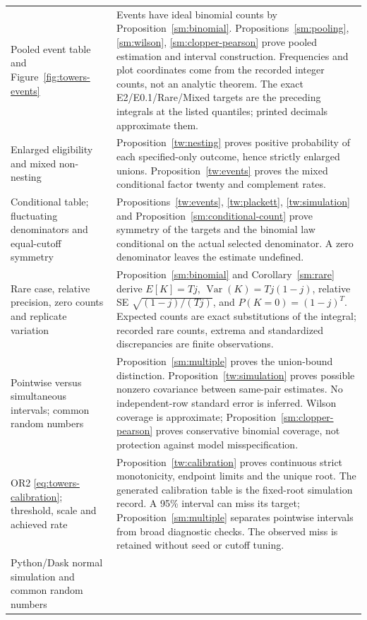 \begin{longtable}{>{\raggedright\arraybackslash}p{.29\linewidth}>{\raggedright\arraybackslash}p{.64\linewidth}}
Pooled event table and Figure~\ref{fig:towers-events}
& Events have ideal binomial counts by Proposition~\ref{sm:binomial}.
Propositions~\ref{sm:pooling}, \ref{sm:wilson}, \ref{sm:clopper-pearson}
prove pooled estimation and interval construction. Frequencies and plot
coordinates come from the recorded integer counts, not an analytic theorem.
The exact E2/E0.1/Rare/Mixed targets are the preceding integrals at the
listed quantiles; printed decimals approximate them.\\
Enlarged eligibility and mixed non-nesting
& Proposition~\ref{tw:nesting} proves positive probability of each
specified-only outcome, hence strictly enlarged unions. Proposition~\ref{tw:events}
proves the mixed conditional factor twenty and complement rates.\\
Conditional table; fluctuating denominators and equal-cutoff symmetry
& Propositions~\ref{tw:events}, \ref{tw:plackett}, \ref{tw:simulation}
and Proposition~\ref{sm:conditional-count} prove symmetry of the targets and
the binomial law conditional on the actual selected denominator. A zero
denominator leaves the estimate undefined.\\
Rare case, relative precision, zero counts and replicate variation
& Proposition~\ref{sm:binomial} and Corollary~\ref{sm:rare} derive \(E[K]=Tj\),
\(\operatorname{Var}(K)=Tj(1-j)\), relative SE
\(\sqrt{(1-j)/(Tj)}\), and \(P(K=0)=(1-j)^T\).
Expected counts are exact substitutions of the integral; recorded rare
counts, extrema and standardized discrepancies are finite observations.\\
Pointwise versus simultaneous intervals; common random numbers
& Proposition~\ref{sm:multiple} proves the union-bound distinction.
Proposition~\ref{tw:simulation} proves possible nonzero covariance between
same-pair estimates. No independent-row standard error is inferred. Wilson
coverage is approximate; Proposition~\ref{sm:clopper-pearson} proves conservative
binomial coverage, not protection against model misspecification.\\
OR2 \eqref{eq:towers-calibration}; threshold, scale and achieved rate
& Proposition~\ref{tw:calibration} proves continuous strict monotonicity,
endpoint limits and the unique root. The generated calibration table is
the fixed-root simulation record. A 95\% interval can miss its target;
Proposition~\ref{sm:multiple} separates pointwise intervals from broad diagnostic
checks. The observed miss is retained without seed or cutoff tuning.\\
Python/Dask normal simulation and common random numbers

\end{longtable}
